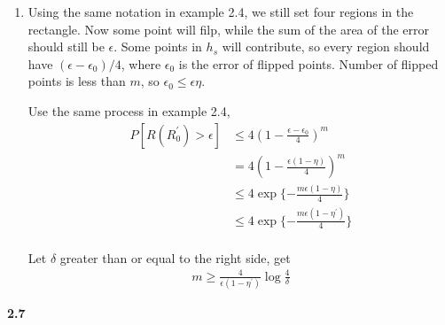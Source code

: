 \documentclass[12pt]{article}
\begin{document}
\begin{enumerate}[label=(\alph*), left=0pt] 
    \item 
    Using the same notation in example 2.4, we still set four regions in the rectangle. 
    Now some point will filp, while the sum of the area of the error should still be $\epsilon$.
    Some points in $h_{s}$ will contribute, so every region should have $(\epsilon - \epsilon _{0}) 
    / 4$, where $\epsilon _{0}$ is the error of flipped points. Number of flipped points is less 
    than $m$, so $\epsilon _{0} \le \epsilon \eta$.

    Use the same process in example 2.4, 
    \begin{align*}
        P[R(R_{0}^{'}) > \epsilon] &\le 4 (1 - \frac{\epsilon - \epsilon _{0}}{4}) ^{m} \\
        &= 4 (1 - \frac{\epsilon (1 - \eta)}{4}) ^{m} \\
        &\le 4 \exp \{- \frac{m \epsilon (1 - \eta)}{4} \} \\
        &\le 4 \exp \{- \frac{m \epsilon (1 - \eta ^{'})}{4} \} \\
    \end{align*}

    Let $\delta$ greater than or equal to the right side, get 
    \begin{align*}
        m \ge \frac{4}{\epsilon (1 - \eta ^{'})} \log \frac{4}{\delta}
    \end{align*}
    
\end{enumerate}

\vspace{1em}

\noindent \textbf{2.7}
\end{document}
